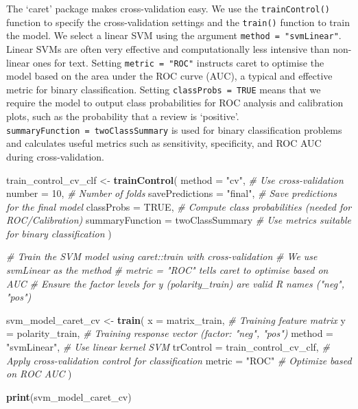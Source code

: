 \documentclass[
]{book}
\newenvironment{Shaded}{\begin{snugshade}}{\end{snugshade}}
\newcommand{\AttributeTok}[1]{\textcolor[rgb]{0.13,0.29,0.53}{#1}}
\newcommand{\CommentTok}[1]{\textcolor[rgb]{0.56,0.35,0.01}{\textit{#1}}}
\newcommand{\ConstantTok}[1]{\textcolor[rgb]{0.56,0.35,0.01}{#1}}
\newcommand{\DecValTok}[1]{\textcolor[rgb]{0.00,0.00,0.81}{#1}}
\newcommand{\FunctionTok}[1]{\textcolor[rgb]{0.13,0.29,0.53}{\textbf{#1}}}
\newcommand{\NormalTok}[1]{#1}
\newcommand{\OtherTok}[1]{\textcolor[rgb]{0.56,0.35,0.01}{#1}}
\newcommand{\StringTok}[1]{\textcolor[rgb]{0.31,0.60,0.02}{#1}}
\begin{document}
The `caret' package makes cross-validation easy. We use the \texttt{trainControl()} function to specify the cross-validation settings and the \texttt{train()} function to train the model. We select a linear SVM using the argument \texttt{method\ =\ "svmLinear"}. Linear SVMs are often very effective and computationally less intensive than non-linear ones for text. Setting \texttt{metric\ =\ "ROC"} instructs caret to optimise the model based on the area under the ROC curve (AUC), a typical and effective metric for binary classification. Setting \texttt{classProbs\ =\ TRUE} means that we require the model to output class probabilities for ROC analysis and calibration plots, such as the probability that a review is `positive'. \texttt{summaryFunction\ =\ twoClassSummary} is used for binary classification problems and calculates useful metrics such as sensitivity, specificity, and ROC AUC during cross-validation.

\begin{Shaded}
\begin{Highlighting}[]
\NormalTok{train\_control\_cv\_clf }\OtherTok{\textless{}{-}} \FunctionTok{trainControl}\NormalTok{(}
  \AttributeTok{method =} \StringTok{"cv"}\NormalTok{,          }\CommentTok{\# Use cross{-}validation}
  \AttributeTok{number =} \DecValTok{10}\NormalTok{,            }\CommentTok{\# Number of folds}
  \AttributeTok{savePredictions =} \StringTok{"final"}\NormalTok{, }\CommentTok{\# Save predictions for the final model}
  \AttributeTok{classProbs =} \ConstantTok{TRUE}\NormalTok{,    }\CommentTok{\# Compute class probabilities (needed for ROC/Calibration)}
  \AttributeTok{summaryFunction =}\NormalTok{ twoClassSummary }\CommentTok{\# Use metrics suitable for binary classification}
\NormalTok{)}

\CommentTok{\# Train the SVM model using caret::train with cross{-}validation}
\CommentTok{\# We use svmLinear as the method}
\CommentTok{\# metric = "ROC" tells caret to optimise based on AUC}
\CommentTok{\# Ensure the factor levels for y (polarity\_train) are valid R names ("neg", "pos")}

\NormalTok{svm\_model\_caret\_cv }\OtherTok{\textless{}{-}} \FunctionTok{train}\NormalTok{(}
  \AttributeTok{x =}\NormalTok{ matrix\_train,      }\CommentTok{\# Training feature matrix}
  \AttributeTok{y =}\NormalTok{ polarity\_train,     }\CommentTok{\# Training response vector (factor: "neg", "pos")}
  \AttributeTok{method =} \StringTok{"svmLinear"}\NormalTok{, }\CommentTok{\# Use linear kernel SVM}
  \AttributeTok{trControl =}\NormalTok{ train\_control\_cv\_clf, }\CommentTok{\# Apply cross{-}validation control for classification}
  \AttributeTok{metric =} \StringTok{"ROC"}         \CommentTok{\# Optimize based on ROC AUC}
\NormalTok{)}

\FunctionTok{print}\NormalTok{(svm\_model\_caret\_cv)}
\end{Highlighting}
\end{Shaded}
\end{document}
